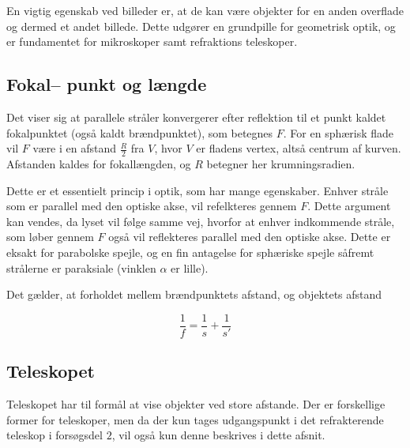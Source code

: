 En vigtig egenskab ved billeder er, at de kan være objekter for en anden overflade og dermed et andet billede. Dette udgører en grundpille for geometrisk optik, og er fundamentet for mikroskoper samt refraktions teleskoper. 


\subsection{Fokal-- punkt og længde}
Det viser sig at parallele stråler konvergerer efter reflektion til et punkt
kaldet fokalpunktet (også kaldt brændpunktet), som betegnes $F$. For en sphærisk flade vil $F$ være i en afstand $\frac{R}{2}$ fra $V$, hvor $V$ er fladens vertex, altså centrum af kurven. Afstanden kaldes for fokallængden, og $R$ betegner her krumningsradien.

Dette er et  essentielt princip i optik, som har mange egenskaber.
Enhver stråle som er parallel med den optiske akse, vil refelkteres gennem $F$. Dette argument kan vendes, da lyset vil følge samme vej, hvorfor at enhver indkommende stråle, som løber gennem $F$ også vil reflekteres parallel med den optiske akse. Dette er eksakt for parabolske spejle, og en fin antagelse for sphæriske spejle såfremt strålerne er paraksiale (vinklen $\alpha$ er lille).

Det gælder, at forholdet mellem brændpunktets afstand, og objektets afstand

\begin{equation}
    \frac{1}{f} = \frac{1}{s} + \frac{1}{s'}
    \label{eq:fokalvokal}
\end{equation}

\subsection{Teleskopet}
Teleskopet har til formål at vise objekter ved store afstande. Der er forskellige former for teleskoper, men da der kun tages udgangspunkt i det refrakterende teleskop i forsøgsdel $2$, vil også kun denne beskrives i dette afsnit.




